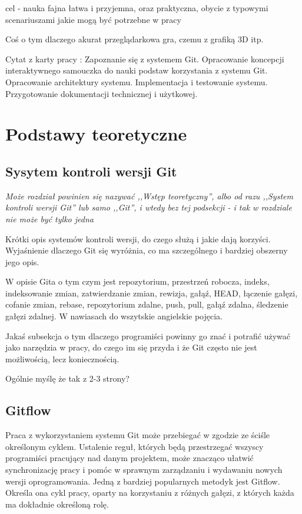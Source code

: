 \documentclass[11pt,a4paper,polish,thesis]{dcsbook}
\begin{document}
	cel - nauka fajna łatwa i przyjemna, oraz praktyczna, obycie z typowymi scenariuszami jakie mogą być potrzebne w pracy
	
	Coś o tym dlaczego akurat przeglądarkowa gra, czemu z grafiką 3D itp.
	
	Cytat z karty pracy : Zapoznanie się z systemem Git. Opracowanie koncepcji interaktywnego samouczka do nauki podstaw korzystania z systemu Git.  Opracowanie architektury systemu. Implementacja i testowanie systemu. Przygotowanie dokumentacji technicznej i użytkowej.
	
	\chapter{Podstawy teoretyczne}
	
	\section{Sysytem kontroli wersji Git}
	\textit{Może rozdział powinien się nazywać ,,Wstęp teoretyczny'', albo od razu ,,System kontroli wersji Git'' lub samo ,,Git'', i wtedy bez tej podsekcji - i tak w rozdziale nie może być tylko jedna}
	
	Krótki opis systemów kontroli wersji, do czego służą i jakie dają korzyści. Wyjaśnienie dlaczego Git się wyróżnia, co ma szczególnego i bardziej obszerny jego opis. 
	
	W opisie Gita o tym czym jest repozytorium, przestrzeń robocza, indeks, indeksowanie zmian, zatwierdzanie zmian, rewizja, gałąź, HEAD, łączenie gałęzi, cofanie zmian, rebase, repozytorium zdalne, push, pull, gałąź zdalna, śledzenie gałęzi zdalnej. W nawiasach do wszytskie angielskie pojęcia. 
	
	Jakaś subsekcja o tym dlaczego programiści powinny go znać i potrafić używać jako narzędzia w pracy, do czego im się przyda i że Git często nie jest możliwością, lecz koniecznością.
	
	Ogólnie myślę że tak z 2-3 strony?
	
	\section{Gitflow}
	
	Praca z wykorzystaniem systemu Git może przebiegać w zgodzie ze ściśle określonym cyklem. Ustalenie reguł, których będą przestrzegać wszyscy programiści pracujący nad danym projektem, może znacząco ułatwić synchronizację pracy i pomóc w sprawnym zarządzaniu i wydawaniu nowych wersji oprogramowania. Jedną z bardziej popularnych metodyk jest Gitflow. Określa ona cykl pracy, oparty na korzystaniu z różnych gałęzi, z których każda ma dokładnie określoną rolę. 
	
\end{document}
